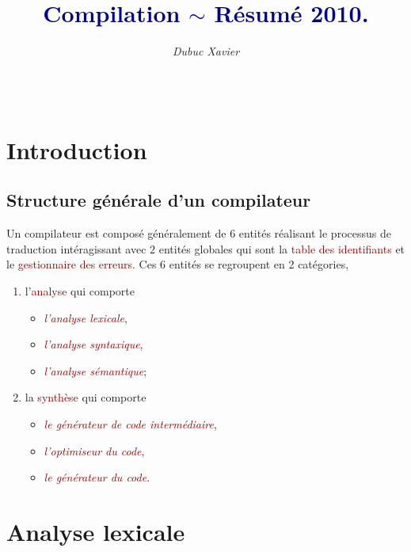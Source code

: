 \documentclass{article}
\title{\textbf{\textcolor{darkblue}{Compilation $\sim$ Résumé 2010.}}}
\author{\textit{Dubuc Xavier} \\ \red{contact@xavierdubuc.com}}
\newcommand{\red}[1]{\textcolor{darkred}{#1}}
\begin{document}
\maketitle

\hbox{\raisebox{0.4em}{\vrule depth 0.4pt height 0.4pt width 10cm}}

\tableofcontents

$ $ \\
\hbox{\raisebox{0.4em}{\vrule depth 0.4pt height 0.4pt width 10cm}}

\newpage

\section{Introduction}

\subsection{Structure générale d'un compilateur}

Un compilateur est composé généralement de $6$ entités réalisant le processus de traduction intéragissant avec $2$ entités globales qui sont la \red{table des identifiants} et le 
\red{gestionnaire des erreurs}. Ces 6 entités se regroupent en 2 catégories, 
\begin{enumerate}
\item l'\red{analyse} qui comporte
	\begin{itemize}
		\item \red{\textit{l'analyse lexicale}},
		\item \red{\textit{l'analyse syntaxique}},
		\item \red{\textit{l'analyse sémantique}};
	\end{itemize}
\item la \red{synthèse} qui comporte
	\begin{itemize}
		\item \red{\textit{le générateur de code intermédiaire}},
		\item \red{\textit{l'optimiseur du code}},
		\item \red{\textit{le générateur du code}}.
	\end{itemize}
\end{enumerate}

\section{Analyse lexicale}
\end{document}
